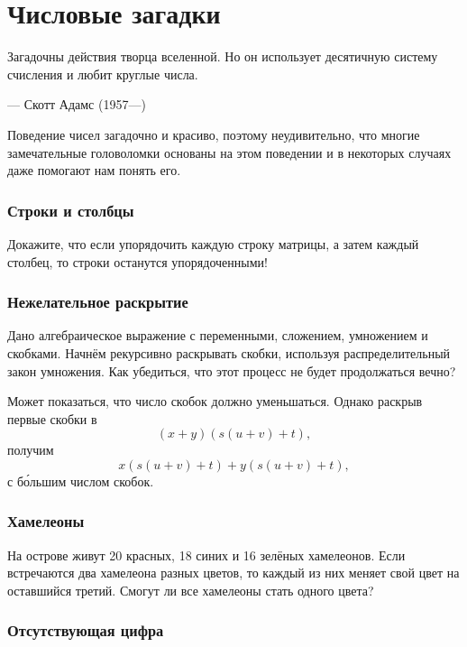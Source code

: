 \chapter{Числовые загадки}



\setlength{\epigraphwidth}{.70\textwidth}
\epigraph{Загадочны действия творца вселенной.
Но он использует десятичную систему счисления и любит круглые
числа.
}{--- Скотт Адамс (1957---)}


Поведение чисел загадочно и красиво, поэтому неудивительно, что многие замечательные головоломки основаны на этом поведении и в некоторых случаях даже помогают нам понять его.

\subsection*{Строки и столбцы}

Докажите, что если упорядочить каждую строку матрицы, а затем каждый столбец, то строки останутся упорядоченными!

\subsection*{Нежелательное раскрытие}

Дано алгебраическое выражение с переменными, сложением, умножением и скобками.
Начнём рекурсивно раскрывать скобки, используя распределительный закон умножения.
Как убедиться, что этот процесс не будет продолжаться вечно?

Может показаться, что число скобок должно уменьшаться.
Однако раскрыв первые скобки в
\[(x + y)(s(u + v) + t),\]
получим
\[x(s(u + v) + t) + y(s(u + v) + t),\]
с б\'{о}льшим числом скобок.

\subsection*{Хамелеоны}\label{Хамелеоны}

На острове живут 20 красных, 18 синих и 16 зелёных хамелеонов.
Если встречаются два хамелеона разных цветов, то каждый из них меняет свой цвет на оставшийся третий.
Смогут ли все хамелеоны стать одного цвета?

\subsection*{Отсутствующая цифра}

